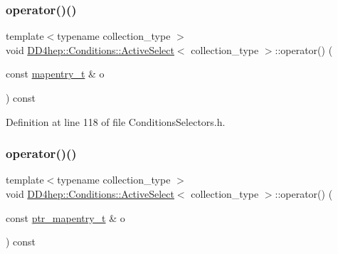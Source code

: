 \subsubsection{\texorpdfstring{operator()()}{operator()()}\hspace{0.1cm}{\footnotesize\ttfamily [3/4]}}
{\footnotesize\ttfamily template$<$typename collection\+\_\+type $>$ \\
void \hyperlink{class_d_d4hep_1_1_conditions_1_1_active_select}{D\+D4hep\+::\+Conditions\+::\+Active\+Select}$<$ collection\+\_\+type $>$\+::operator() (\begin{DoxyParamCaption}\item[{const \hyperlink{class_d_d4hep_1_1_conditions_1_1_cond_____oper_a877dac3da66795207aed15be219acbdc}{mapentry\+\_\+t} \&}]{o }\end{DoxyParamCaption}) const\hspace{0.3cm}{\ttfamily [inline]}}



Definition at line 118 of file Conditions\+Selectors.\+h.

\hypertarget{class_d_d4hep_1_1_conditions_1_1_active_select_a3ef8ddc81bc1994973be61524316198a}{}\label{class_d_d4hep_1_1_conditions_1_1_active_select_a3ef8ddc81bc1994973be61524316198a} 
\subsubsection{\texorpdfstring{operator()()}{operator()()}\hspace{0.1cm}{\footnotesize\ttfamily [4/4]}}
{\footnotesize\ttfamily template$<$typename collection\+\_\+type $>$ \\
void \hyperlink{class_d_d4hep_1_1_conditions_1_1_active_select}{D\+D4hep\+::\+Conditions\+::\+Active\+Select}$<$ collection\+\_\+type $>$\+::operator() (\begin{DoxyParamCaption}\item[{const \hyperlink{class_d_d4hep_1_1_conditions_1_1_cond_____oper_a0949e4bd5f90cd3fae2394cf30983973}{ptr\+\_\+mapentry\+\_\+t} \&}]{o }\end{DoxyParamCaption}) const\hspace{0.3cm}{\ttfamily [inline]}}



